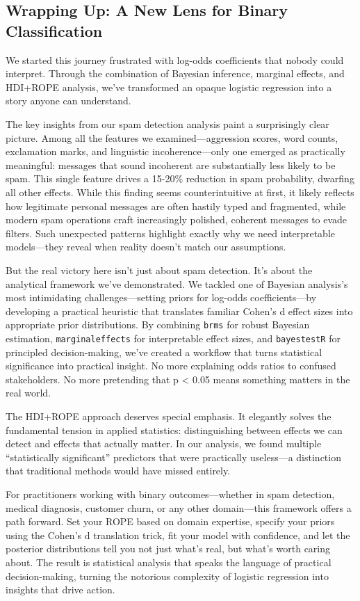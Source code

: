 \documentclass[
  letterpaper,
  DIV=11,
  numbers=noendperiod]{scrartcl}
\begin{document}
\subsection{Wrapping Up: A New Lens for Binary
Classification}\label{wrapping-up-a-new-lens-for-binary-classification}

We started this journey frustrated with log-odds coefficients that
nobody could interpret. Through the combination of Bayesian inference,
marginal effects, and HDI+ROPE analysis, we've transformed an opaque
logistic regression into a story anyone can understand.

The key insights from our spam detection analysis paint a surprisingly
clear picture. Among all the features we examined---aggression scores,
word counts, exclamation marks, and linguistic incoherence---only one
emerged as practically meaningful: messages that sound incoherent are
substantially less likely to be spam. This single feature drives a
15-20\% reduction in spam probability, dwarfing all other effects. While
this finding seems counterintuitive at first, it likely reflects how
legitimate personal messages are often hastily typed and fragmented,
while modern spam operations craft increasingly polished, coherent
messages to evade filters. Such unexpected patterns highlight exactly
why we need interpretable models---they reveal when reality doesn't
match our assumptions.

But the real victory here isn't just about spam detection. It's about
the analytical framework we've demonstrated. We tackled one of Bayesian
analysis's most intimidating challenges---setting priors for log-odds
coefficients---by developing a practical heuristic that translates
familiar Cohen's d effect sizes into appropriate prior distributions. By
combining \texttt{brms} for robust Bayesian estimation,
\texttt{marginaleffects} for interpretable effect sizes, and
\texttt{bayestestR} for principled decision-making, we've created a
workflow that turns statistical significance into practical insight. No
more explaining odds ratios to confused stakeholders. No more pretending
that p \textless{} 0.05 means something matters in the real world.

The HDI+ROPE approach deserves special emphasis. It elegantly solves the
fundamental tension in applied statistics: distinguishing between
effects we can detect and effects that actually matter. In our analysis,
we found multiple ``statistically significant'' predictors that were
practically useless---a distinction that traditional methods would have
missed entirely.

For practitioners working with binary outcomes---whether in spam
detection, medical diagnosis, customer churn, or any other domain---this
framework offers a path forward. Set your ROPE based on domain
expertise, specify your priors using the Cohen's d translation trick,
fit your model with confidence, and let the posterior distributions tell
you not just what's real, but what's worth caring about. The result is
statistical analysis that speaks the language of practical
decision-making, turning the notorious complexity of logistic regression
into insights that drive action.
\end{document}
